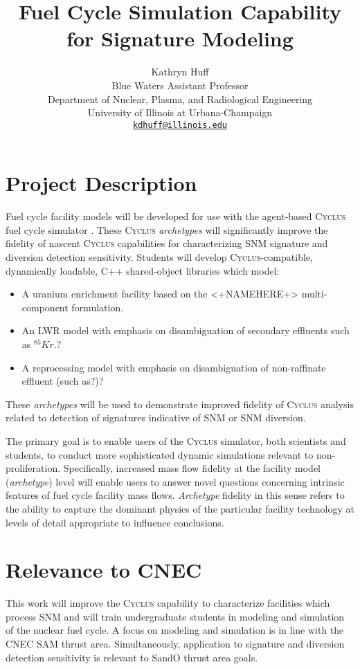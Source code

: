 \documentclass[letterpaper]{article}
\author{Kathryn Huff\\
        Blue Waters Assistant Professor\\
        Department of Nuclear, Plasma, and Radiological Engineering\\
        University of Illinois at Urbana-Champaign\\
         \href{mailto:kdhuff@illinois.edu}{\texttt{kdhuff@illinois.edu}}}
\title{Fuel Cycle Simulation Capability for Signature Modeling}
\newcommand{\Cyclus}{\textsc{Cyclus}\xspace}%
\begin{document}
\maketitle
\section{Project Description}

Fuel cycle facility models will be developed for use with the agent-based 
\Cyclus fuel cycle simulator \cite{huff_fundamental_2016}. These \Cyclus
\emph{archetypes} will significantly improve the fidelity of nascent \Cyclus
capabilities for characterizing \gls{SNM} signature and diversion detection
sensitivity\cite{mcgarry_mbmore_2017}.  Students will develop
\Cyclus-compatible, dynamically loadable, C++ shared-object libraries which
model:
\begin{itemize}
\item A uranium enrichment facility based on the <+NAMEHERE+> multi-component 
        formulation.
\item An \gls{LWR} model with emphasis on disambiguation of secondary effluents 
        such as $^{85}Kr$.?
\item A reprocessing model with emphasis on disambiguation of non-raffinate 
        effluent (such as?)?
\end{itemize}

These \emph{archetypes} will be used to demonstrate improved fidelity of 
\Cyclus analysis related to detection of signatures indicative of \gls{SNM} or 
\gls{SNM} diversion. 


The primary goal is to enable users of the \Cyclus simulator, both scientists
and students, to conduct more sophisticated dynamic simulations relevant to
non-proliferation. Specifically, increased mass flow fidelity at the facility
model (\emph{archetype}) level will enable users to answer novel questions
concerning intrinsic features of fuel cycle facility mass flows.
\emph{Archetype} fidelity in this sense refers to the ability to capture the
dominant physics of the particular facility technology at levels of detail
appropriate to influence conclusions.

\section{Relevance to CNEC}
This work will improve the \Cyclus capability to characterize facilities which process
\gls{SNM} and will train undergraduate students in modeling and simulation of
the nuclear fuel cycle. A focus on modeling and simulation is in line with the 
\gls{CNEC} \gls{SAM} thrust area. Simultaneously, application to signature and
diversion detection sensitivity is relevant to \gls{SandO} thrust area goals. 
\end{document}

